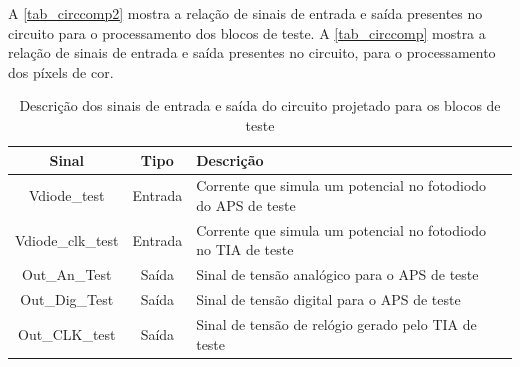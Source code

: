 A \autoref{tab_circcomp2} mostra a relação de sinais de entrada e sa\'ida presentes no circuito para o processamento dos blocos de teste. A \autoref{tab_circcomp} mostra a relação de sinais de entrada e sa\'ida presentes no circuito, para o processamento dos p\'ixels de cor.

\begin{table}[ht]
  \caption{Descrição dos sinais de entrada e sa\'ida do circuito projetado para os blocos de teste}%
  \label{tab_circcomp2}
  \begin{tabular}{ccl}
  \toprule
   Sinal & Tipo & Descrição \\
   \midrule \midrule
   Vdiode\_test & Entrada & Corrente que simula um potencial no fotodiodo do APS de teste\\
   \midrule
   Vdiode\_clk\_test & Entrada & Corrente que simula um potencial no fotodiodo no TIA de teste\\
   \midrule
   Out\_An\_Test & Sa\'ida & Sinal de tensão anal\'ogico para o APS de teste \\
   \midrule
   Out\_Dig\_Test & Sa\'ida & Sinal de tensão digital para o APS de teste \\
  \midrule
   Out\_CLK\_test & Sa\'ida & Sinal de tensão de rel\'ogio gerado pelo TIA de teste\\
  \bottomrule
\end{tabular}%
\end{table}

